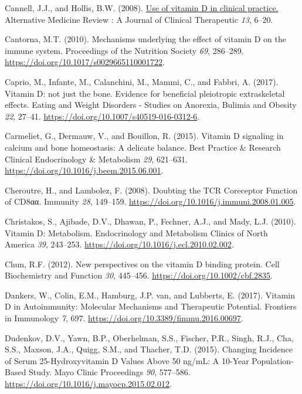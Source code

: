 \documentclass[
  a4paper,
  DIV=11,
  numbers=noendperiod,
  listof=totoc]{scrreprt}
\newlength{\cslhangindent}
\newlength{\cslentryspacingunit} %
\newenvironment{CSLReferences}[2] %
 {%
  \setlength{\parindent}{0pt}
  \ifodd #1
  \let\oldpar\par
  \def\par{\hangindent=\cslhangindent\oldpar}
  \fi
  \setlength{\parskip}{#2\cslentryspacingunit}
 }%
 {}
\begin{document}
\begin{CSLReferences}{0}{0}
\leavevmode{}%
Cannell, J.J., and Hollis, B.W. (2008).
\href{https://www.ncbi.nlm.nih.gov/pubmed/18377099}{{Use of vitamin D in
clinical practice.}} Alternative Medicine Review : A Journal of Clinical
Therapeutic \emph{13}, 6--20.

\leavevmode{}%
Cantorna, M.T. (2010). {Mechanisms underlying the effect of vitamin D on
the immune system}. Proceedings of the Nutrition Society \emph{69},
286--289. \url{https://doi.org/10.1017/s0029665110001722}.

\leavevmode{}%
Caprio, M., Infante, M., Calanchini, M., Mammi, C., and Fabbri, A.
(2017). {Vitamin D: not just the bone. Evidence for beneficial
pleiotropic extraskeletal effects}. Eating and Weight Disorders -
Studies on Anorexia, Bulimia and Obesity \emph{22}, 27--41.
\url{https://doi.org/10.1007/s40519-016-0312-6}.

\leavevmode{}%
Carmeliet, G., Dermauw, V., and Bouillon, R. (2015). {Vitamin D
signaling in calcium and bone homeostasis: A delicate balance}. Best
Practice \& Research Clinical Endocrinology \& Metabolism \emph{29},
621--631. \url{https://doi.org/10.1016/j.beem.2015.06.001}.

\leavevmode{}%
Cheroutre, H., and Lambolez, F. (2008). {Doubting the TCR Coreceptor
Function of CD8αα}. Immunity \emph{28}, 149--159.
\url{https://doi.org/10.1016/j.immuni.2008.01.005}.

\leavevmode{}%
Christakos, S., Ajibade, D.V., Dhawan, P., Fechner, A.J., and Mady, L.J.
(2010). {Vitamin D: Metabolism}. Endocrinology and Metabolism Clinics of
North America \emph{39}, 243--253.
\url{https://doi.org/10.1016/j.ecl.2010.02.002}.

\leavevmode{}%
Chun, R.F. (2012). {New perspectives on the vitamin D binding protein}.
Cell Biochemistry and Function \emph{30}, 445--456.
\url{https://doi.org/10.1002/cbf.2835}.

\leavevmode{}%
Dankers, W., Colin, E.M., Hamburg, J.P. van, and Lubberts, E. (2017).
{Vitamin D in Autoimmunity: Molecular Mechanisms and Therapeutic
Potential}. Frontiers in Immunology \emph{7}, 697.
\url{https://doi.org/10.3389/fimmu.2016.00697}.

\leavevmode{}%
Dudenkov, D.V., Yawn, B.P., Oberhelman, S.S., Fischer, P.R., Singh,
R.J., Cha, S.S., Maxson, J.A., Quigg, S.M., and Thacher, T.D. (2015).
{Changing Incidence of Serum 25-Hydroxyvitamin D Values Above 50 ng/mL:
A 10-Year Population-Based Study}. Mayo Clinic Proceedings \emph{90},
577--586. \url{https://doi.org/10.1016/j.mayocp.2015.02.012}.


\end{CSLReferences}
\end{document}
